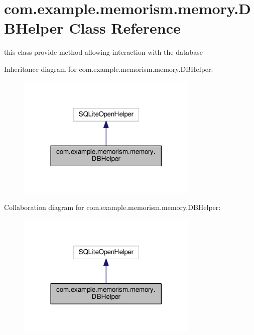 \hypertarget{classcom_1_1example_1_1memorism_1_1memory_1_1_d_b_helper}{}\section{com.\+example.\+memorism.\+memory.\+D\+B\+Helper Class Reference}
\label{classcom_1_1example_1_1memorism_1_1memory_1_1_d_b_helper}


this class provide method allowing interaction with the database  




Inheritance diagram for com.\+example.\+memorism.\+memory.\+D\+B\+Helper\+:\nopagebreak
\begin{figure}[H]
\begin{center}
\leavevmode
\includegraphics[width=245pt]{d2/d8c/classcom_1_1example_1_1memorism_1_1memory_1_1_d_b_helper__inherit__graph}
\end{center}
\end{figure}


Collaboration diagram for com.\+example.\+memorism.\+memory.\+D\+B\+Helper\+:\nopagebreak
\begin{figure}[H]
\begin{center}
\leavevmode
\includegraphics[width=245pt]{d5/d96/classcom_1_1example_1_1memorism_1_1memory_1_1_d_b_helper__coll__graph}
\end{center}
\end{figure}
